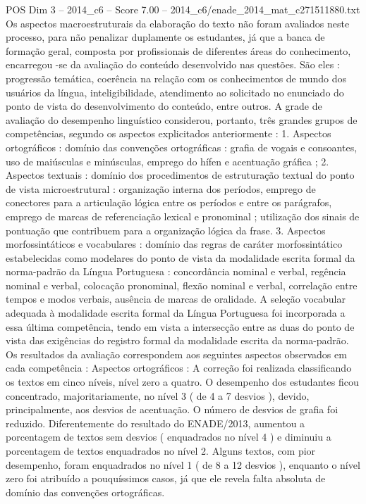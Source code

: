 \begin{textsample}{POS Dim 3 – 2014\_c6 – Score 7.00 – 2014\_c6/enade\_2014\_mat\_c271511880.txt}
Os aspectos macroestruturais da elaboração do texto não foram avaliados neste processo, para não penalizar duplamente os estudantes, já que a banca de formação geral, composta por profissionais de diferentes áreas do conhecimento, encarregou -se da avaliação do conteúdo desenvolvido nas questões.
São eles : progressão temática, coerência na relação com os conhecimentos de mundo dos usuários da língua, inteligibilidade, atendimento ao solicitado no enunciado do ponto de vista do desenvolvimento do conteúdo, entre outros.
A grade de avaliação do desempenho linguístico considerou, portanto, três grandes grupos de competências, segundo os aspectos explicitados anteriormente : 1.
Aspectos ortográficos : domínio das convenções ortográficas : grafia de vogais e consoantes, uso de maiúsculas e minúsculas, emprego do hífen e acentuação gráfica ; 2.
Aspectos textuais : domínio dos procedimentos de estruturação textual do ponto de vista microestrutural : organização interna dos períodos, emprego de conectores para a articulação lógica entre os períodos e entre os parágrafos, emprego de marcas de referenciação lexical e pronominal ; utilização dos sinais de pontuação que contribuem para a organização lógica da frase. 3.
Aspectos morfossintáticos e vocabulares : domínio das regras de caráter morfossintático estabelecidas como modelares do ponto de vista da modalidade escrita formal da norma-padrão da Língua Portuguesa : concordância nominal e verbal, regência nominal e verbal, colocação pronominal, flexão nominal e verbal, correlação entre tempos e modos verbais, ausência de marcas de oralidade.
A seleção vocabular adequada à modalidade escrita formal da Língua Portuguesa foi incorporada a essa última competência, tendo em vista a intersecção entre as duas do ponto de vista das exigências do registro formal da modalidade escrita da norma-padrão.
Os resultados da avaliação correspondem aos seguintes aspectos observados em cada competência : Aspectos ortográficos : A correção foi realizada classificando os textos em cinco níveis, nível zero a quatro.
O desempenho dos estudantes ficou concentrado, majoritariamente, no nível 3 ( de 4 a 7 desvios ), devido, principalmente, aos desvios de acentuação.
O número de desvios de grafia foi reduzido.
Diferentemente do resultado do ENADE/2013, aumentou a porcentagem de textos sem desvios ( enquadrados no nível 4 ) e diminuiu a porcentagem de textos enquadrados no nível 2.
Alguns textos, com pior desempenho, foram enquadrados no nível 1 ( de 8 a 12 desvios ), enquanto o nível zero foi atribuído a pouquíssimos casos, já que ele revela falta absoluta de domínio das convenções ortográficas.

\end{textsample}
